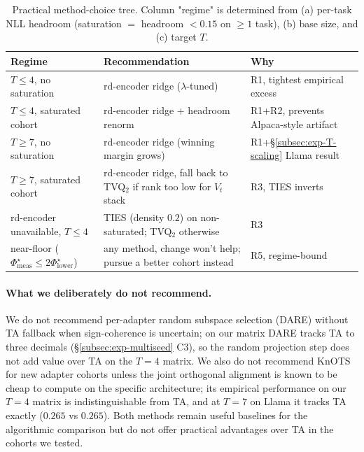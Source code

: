 \begin{table}[t]
\centering
\caption{Practical method-choice tree. Column "regime" is determined
from (a) per-task NLL headroom (saturation $=$ headroom $< 0.15$ on
$\geq 1$ task), (b) base size, and (c) target $T$.}
\label{tab:practical-tree}
\small
\begin{tabular}{lll}
\hline
Regime & Recommendation & Why \\
\hline
$T \leq 4$, no saturation        & rd-encoder ridge ($\lambda$-tuned)   & R1, tightest empirical excess \\
$T \leq 4$, saturated cohort     & rd-encoder ridge + headroom renorm    & R1+R2, prevents Alpaca-style artifact \\
$T \geq 7$, no saturation        & rd-encoder ridge (winning margin grows) & R1+\S\ref{subsec:exp-T-scaling} Llama result \\
$T \geq 7$, saturated cohort     & rd-encoder ridge, fall back to TVQ$_2$ if rank too low for $V_t$ stack & R3, TIES inverts \\
rd-encoder unavailable, $T \leq 4$ & TIES (density $0.2$) on non-saturated; TVQ$_2$ otherwise & R3 \\
near-floor ($\Phi^\star_{\mathrm{meas}} \leq 2 \Phi^\star_{\mathrm{lower}}$) & any method, change won't help; pursue a better cohort instead & R5, regime-bound \\
\hline
\end{tabular}
\end{table}

\paragraph{What we deliberately do not recommend.}
We do not recommend per-adapter random subspace selection (DARE)
without TA fallback when sign-coherence is uncertain; on our matrix
DARE tracks TA to three decimals (\S\ref{subsec:exp-multiseed} C3),
so the random projection step does not add value over TA on the
$T = 4$ matrix. We also do not recommend KnOTS for new adapter
cohorts unless the joint orthogonal alignment is known to be cheap
to compute on the specific architecture; its empirical performance
on our $T = 4$ matrix is indistinguishable from TA, and at $T = 7$
on Llama it tracks TA exactly ($0.265$ vs $0.265$). Both methods
remain useful baselines for the algorithmic comparison but do not
offer practical advantages over TA in the cohorts we tested.

